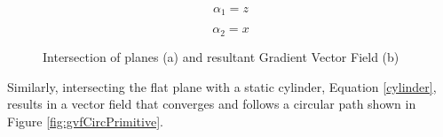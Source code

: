 \documentclass[numbered,pdftex]{ohio-etd}
\begin{document}
\begin{equation}
\label{planeZ}
\alpha_1 = z
\end{equation}

\begin{equation}
\label{planeX}
\alpha_2 = x
\end{equation}

\begin{figure}[H]
	\begin{subfigmatrix}{2}%
		\centering	
		\hspace*{0mm}
	\end{subfigmatrix}
	\caption{Intersection of planes (a) and resultant Gradient Vector Field (b)}
	\label{fig:gvfLinePrimitive}
\end{figure}

Similarly, intersecting the flat plane with a static cylinder, Equation \ref{cylinder}, results in a vector field that converges and follows a circular path shown in Figure \ref{fig:gvfCircPrimitive}.
\end{document}
